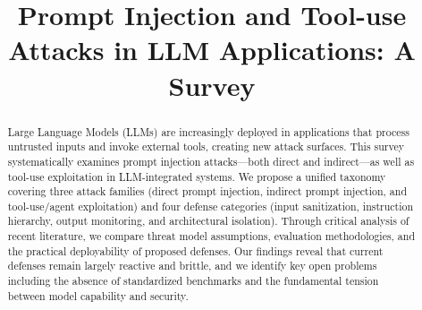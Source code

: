\documentclass[conference]{IEEEtran}
\begin{document}
\title{Prompt Injection and Tool-use Attacks in LLM Applications: A Survey}

\author{
\and
{}
\and
{}
\and
{}
\and
{}
}

\maketitle

\begin{abstract}
Large Language Models (LLMs) are increasingly deployed in applications that
process untrusted inputs and invoke external tools, creating new attack surfaces.
This survey systematically examines prompt injection attacks---both direct and
indirect---as well as tool-use exploitation in LLM-integrated systems. We
propose a unified taxonomy covering three attack families (direct prompt
injection, indirect prompt injection, and tool-use/agent exploitation) and four
defense categories (input sanitization, instruction hierarchy, output
monitoring, and architectural isolation). Through critical analysis of recent
literature, we compare threat model assumptions, evaluation methodologies, and
the practical deployability of proposed defenses. Our findings reveal that
current defenses remain largely reactive and brittle, and we identify key open
problems including the absence of standardized benchmarks and the fundamental
tension between model capability and security.
\end{abstract}
\end{document}
